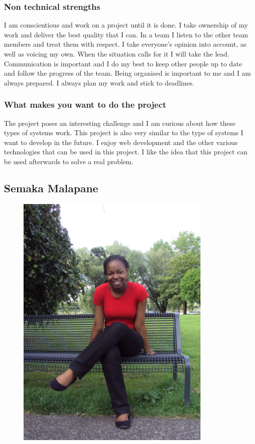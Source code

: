 \documentclass[hidelinks, 12pt, oneside]{article}
\begin{document}
\subsubsection{Non technical strengths}
I am conscientious and work on a project until it is done. I take ownership of my work and deliver the best quality that I can. In a team I listen to the other team members and treat them with respect. I take everyone’s opinion into account, as well as voicing my own. When the situation calls for it I will take the lead. Communication is important and I do my best to keep other people up to date and follow the progress of the team. Being organised is important to me and I am always prepared. I always plan my work and stick to deadlines.
\subsubsection{What makes you want to do the project}
The project poses an interesting challenge and I am curious about how these types of systems work. This project is also very similar to the type of systems I want to develop in the future. I enjoy web development and the other various technologies that can be used in this project. I like the idea that this project can be used afterwards to solve a real problem.
\subsection{Semaka Malapane}

\begin{figure}[h!]
  \centering
    \includegraphics[width=0.85\textwidth]{Semaka} 
\end{figure}
\end{document}
